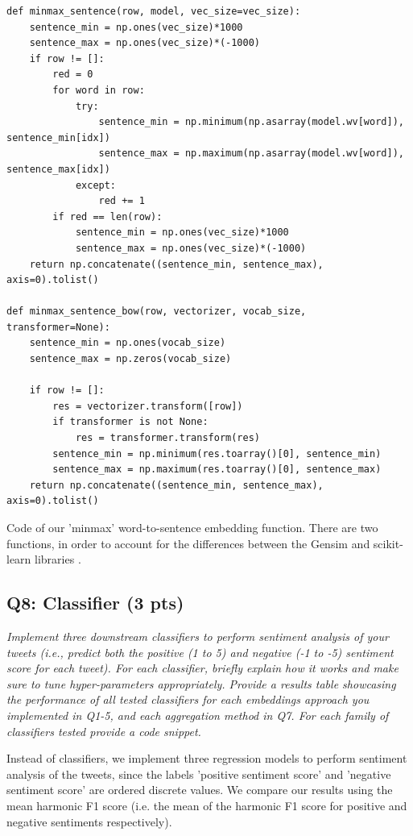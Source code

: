\begin{listing*}
\begin{verbatim}
def minmax_sentence(row, model, vec_size=vec_size):
    sentence_min = np.ones(vec_size)*1000
    sentence_max = np.ones(vec_size)*(-1000)
    if row != []:
        red = 0
        for word in row:
            try:
                sentence_min = np.minimum(np.asarray(model.wv[word]), sentence_min[idx])
                sentence_max = np.maximum(np.asarray(model.wv[word]), sentence_max[idx])
            except:
                red += 1
        if red == len(row):
            sentence_min = np.ones(vec_size)*1000
            sentence_max = np.ones(vec_size)*(-1000)
    return np.concatenate((sentence_min, sentence_max), axis=0).tolist()

def minmax_sentence_bow(row, vectorizer, vocab_size, transformer=None):
    sentence_min = np.ones(vocab_size)
    sentence_max = np.zeros(vocab_size)
    
    if row != []:
        res = vectorizer.transform([row])
        if transformer is not None:
            res = transformer.transform(res)
        sentence_min = np.minimum(res.toarray()[0], sentence_min)
        sentence_max = np.maximum(res.toarray()[0], sentence_max)
    return np.concatenate((sentence_min, sentence_max), axis=0).tolist()
\end{verbatim}
\caption{Code of our 'minmax' word-to-sentence embedding function. There are two functions, in order to account for the differences between the Gensim \cite{gensim} and scikit-learn libraries \cite{sklearn1, sklearn2}.}
\label{listing:p2-minmax}
\end{listing*}


\subsection*{Q8: Classifier (3 pts)}
\textit{Implement three downstream classifiers to perform sentiment analysis of your tweets (i.e., predict both the positive (1 to 5) and negative (-1 to -5) sentiment score for each tweet). For each classifier, briefly explain how it works and make sure to tune hyper-parameters appropriately. Provide a results table showcasing the performance of all tested classifiers for each embeddings approach you implemented in Q1-5, and each aggregation method in Q7. For each family of classifiers tested provide a code snippet.}

Instead of classifiers, we implement three regression models to perform sentiment analysis of the tweets, since the labels 'positive sentiment score' and 'negative sentiment score' are ordered discrete values. We compare our results using the mean harmonic F1 score (i.e. the mean of the harmonic F1 score for positive and negative sentiments respectively).

